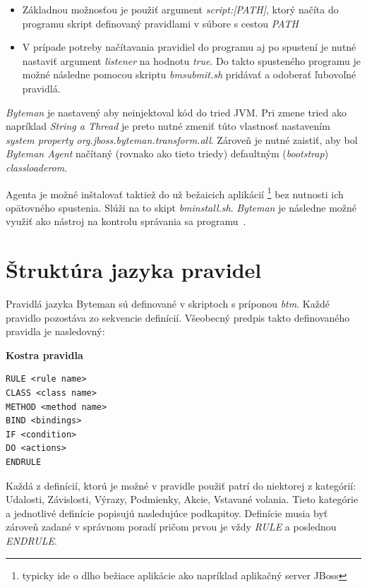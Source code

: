 \documentclass[11pt,final,oneside]{fithesis}
\newenvironment{example}[1]
{
\vspace{3mm}
\noindent\textbf{#1}
\vspace{2mm}
}
{
\vspace{3mm}
}
\begin{document}
\begin{itemize}
\item Základnou možnosťou je použiť argument \textit{script:[PATH]}, ktorý
načíta do programu skript definovaný pravidlami v súbore s cestou
\textit{PATH}
\item V prípade potreby načítavania pravidiel do programu aj po spustení je nutné
nastaviť argument \textit{listener} na hodnotu \textit{true}. Do takto
spusteného programu je možné následne pomocou skriptu \textit{bmsubmit.sh}
pridávať a odoberať ľubovoľné pravidlá.
\end{itemize}

\textit{Byteman} je nastavený aby neinjektoval kód do tried JVM. Pri zmene tried
ako napríklad \textit{String a Thread} je preto nutné zmeniť túto vlastnosť
nastavením \textit{system property org.jboss.byteman.transform.all}. Zároveň je 
nutné zaistiť, aby bol \textit{Byteman Agent} načítaný (rovnako ako tieto triedy)
defaultným (\textit{bootstrap}) \textit{classloaderom}.

Agenta je možné inštalovať taktiež do už bežaicich aplikácií \footnote{typicky
ide o dlho bežiace aplikácie ako napríklad aplikačný server JBoss} bez nutnosti 
ich opätovného spustenia. Slúži na to skipt \textit{bminstall.sh}.
\textit{Byteman} je následne možné využiť ako nástroj na kontrolu správania sa 
programu~\cite{RedHat:Byteman}. 

\section{Štruktúra jazyka pravidel}
Pravidlá jazyka Byteman sú definované v skriptoch s príponou \textit{btm}.
Každé pravidlo pozostáva zo sekvencie definícií. Všeobecný predpis takto
definovaného pravidla je nasledovný:

\begin{example}{Kostra pravidla}
\begin{verbatim}
RULE <rule name>
CLASS <class name>
METHOD <method name>
BIND <bindings>
IF <condition>
DO <actions>
ENDRULE
\end{verbatim}
\end{example}

Každá z definícií, ktorú je možné v pravidle použiť patrí do niektorej z kategórií: Udalosti, Závislosti, Výrazy, Podmienky, Akcie, Vstavané volania. Tieto kategórie a jednotlivé definície popisujú nasledujúce podkapitoy.
Definície musia byť zároveň zadané v správnom poradí pričom prvou je vždy
\textit{RULE} a poslednou \textit{ENDRULE}.
\end{document}
